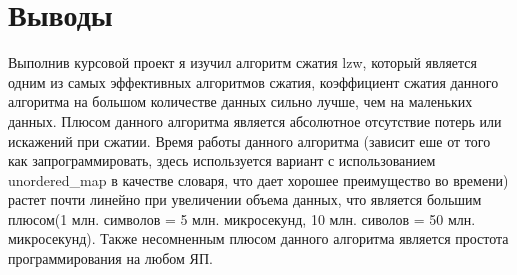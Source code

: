 \section{Выводы}
Выполнив курсовой проект я изучил алгоритм сжатия lzw, который является одним из самых эффективных алгоритмов сжатия, коэффициент сжатия данного алгоритма на большом количестве данных сильно лучше, чем на маленьких данных. Плюсом данного алгоритма является абсолютное отсутствие потерь или искажений при сжатии. Время работы данного алгоритма (зависит еше от того как запрограммировать, здесь используется вариант с использованием unordered\_map в качестве словаря, что дает хорошее преимущество во времени) растет почти линейно при увеличении объема данных, что является большим плюсом(1 млн. символов = 5 млн. микросекунд, 10 млн. сиволов =  50 млн. микросекунд). Также несомненным плюсом данного алгоритма является простота программирования на любом ЯП.
\pagebreak
